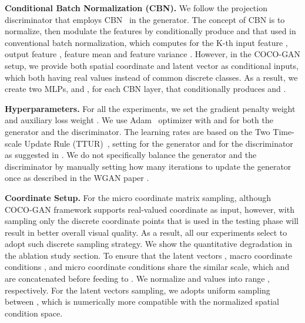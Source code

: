 \documentclass{article}
\begin{document}
\begin{appendices}
    \vspace{0.5em} \noindent \textbf{Conditional Batch Normalization (CBN).} We follow the projection discriminator that employs CBN~\cite{CBN,cont-CBN} in the generator. The concept of CBN is to normalize, then modulate the features by conditionally produce  and  that used in conventional batch normalization, which computes  for the K-th input feature , output feature , feature mean  and feature variance . However, in the COCO-GAN setup, we provide both spatial coordinate and latent vector as conditional inputs, which both having real values instead of common discrete classes. As a result, we create two MLPs,  and , for each CBN layer, that conditionally produces  and .
    
    \vspace{0.5em} \noindent \textbf{Hyperparameters.} For all the experiments, we set the gradient penalty weight  and auxiliary loss weight . We use Adam~\cite{Adam} optimizer with  and  for both the generator and the discriminator. The learning rates are based on the Two Time-scale Update Rule (TTUR)~\cite{fid}, setting  for the generator and  for the discriminator as suggested in \cite{SAGAN}. We do not specifically balance the generator and the discriminator by manually setting how many iterations to update the generator once as described in the WGAN paper \cite{WGAN}.
    
    \vspace{0.5em} \noindent \textbf{Coordinate Setup.} For the micro coordinate matrix  sampling, although COCO-GAN framework supports real-valued coordinate as input, however, with sampling only the discrete coordinate points that is used in the testing phase will result in better overall visual quality. As a result, all our experiments select to adopt such discrete sampling strategy. We show the quantitative degradation in the ablation study section. To ensure that the latent vectors , macro coordinate conditions , and micro coordinate conditions  share the similar scale, which  and  are concatenated before feeding to . We normalize  and  values into range , respectively. For the latent vectors  sampling, we adopts uniform sampling between , which is numerically more compatible with the normalized spatial condition space.
    

\end{appendices}
\end{document}
